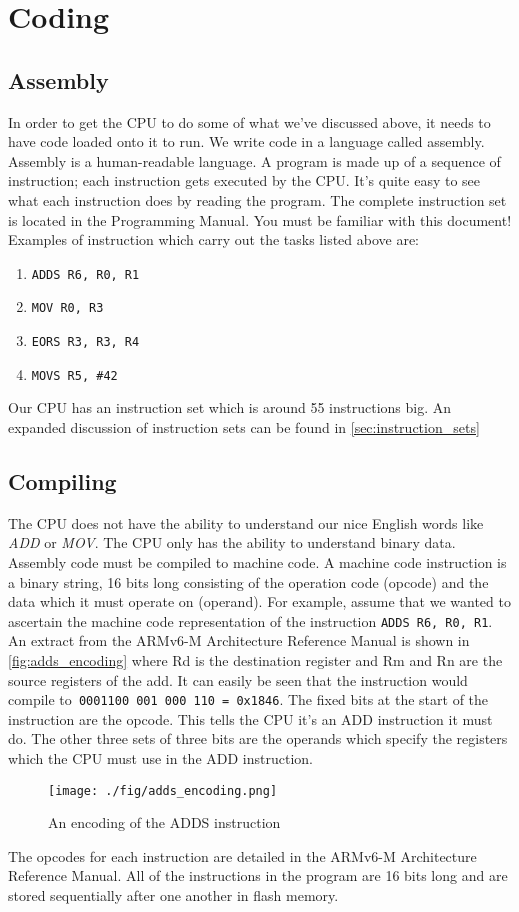 \chapter{Coding}

\section{Assembly}

In order to get the CPU to do some of what we've discussed above, it needs to have code loaded onto it to run. We write code in a language called assembly. Assembly is a human-readable language. A program is made up of a sequence of instruction; each instruction gets executed by the CPU. It's quite easy to see what each instruction does by reading the program.  The complete instruction set is located in the Programming Manual. You must be familiar with this document! Examples of instruction which carry out the tasks listed above are:
\begin{enumerate}
  \item \texttt{ADDS R6, R0, R1}
  \item \texttt{MOV R0, R3}
  \item \texttt{EORS R3, R3, R4}
  \item \texttt{MOVS R5, \#42}
\end{enumerate}

Our CPU has an instruction set which is around 55 instructions big. An expanded discussion of instruction sets can be found in \autoref{sec:instruction_sets}

\section{Compiling}
The CPU does not have the ability to understand our nice English words like \textit{ADD} or \textit{MOV}. The CPU only has the ability to understand binary data. Assembly code must be compiled to machine code. A machine code instruction is a binary string, 16 bits long consisting of the operation code (opcode) and the data which it must operate on (operand).
For example, assume that we wanted to ascertain the machine code representation of the instruction \texttt{ADDS R6, R0, R1}. An extract from the ARMv6-M Architecture Reference Manual is shown in \autoref{fig:adds_encoding} where Rd is the destination register and Rm and Rn are the source registers of the add. It can easily be seen that the instruction would compile to\texttt{ 0001100 001 000 110 = 0x1846}. The fixed bits at the start of the instruction are the opcode. This tells the CPU it's an ADD instruction it must do. The other three sets of three bits are the operands which specify the registers which the CPU must use in the ADD instruction. 
\begin{figure}
  \centering
  \texttt{[image: ./fig/adds\_encoding.png]}
  \caption{An encoding of the ADDS instruction}
  \label{fig:adds_encoding}
\end{figure}
The opcodes for each instruction are detailed in the ARMv6-M Architecture Reference Manual.
All of the instructions in the program are 16 bits long and are stored sequentially after one another in flash memory. 

